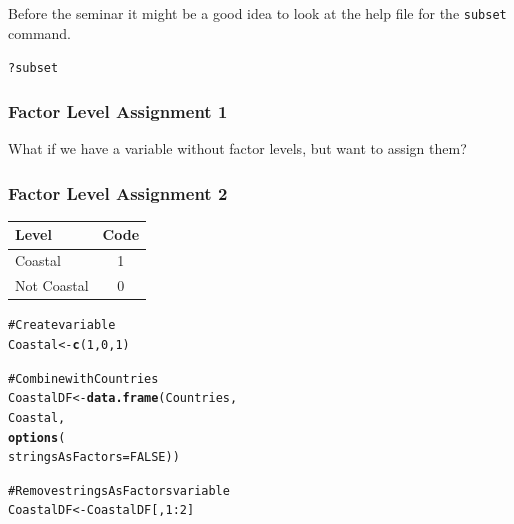 \documentclass{beamer}\usepackage{graphicx, color}
\makeatletter
\newcommand{\hlfunctioncall}[1]{\textcolor[rgb]{0.501960784313725,0,0.329411764705882}{\textbf{#1}}}%
\newcommand{\hlcomment}[1]{\textcolor[rgb]{0.180392156862745,0.6,0.341176470588235}{#1}}%
\newenvironment{kframe}{%
 \def\at@end@of@kframe{}%
 \ifinner\ifhmode%
  \def\at@end@of@kframe{\end{minipage}}%
  \begin{minipage}{\columnwidth}%
 \fi\fi%
 \def\FrameCommand##1{\hskip\@totalleftmargin \hskip-\fboxsep
 \colorbox{shadecolor}{##1}\hskip-\fboxsep
     \hskip-\linewidth \hskip-\@totalleftmargin \hskip\columnwidth}%
 \MakeFramed {\advance\hsize-\width
   \@totalleftmargin\z@ \linewidth\hsize
   \@setminipage}}%
 {\par\unskip\endMakeFramed%
 \at@end@of@kframe}
\newenvironment{knitrout}{}{} %
\makeatother
\begin{document}
\begin{frame}[fragile]
  Before the seminar it might be a good idea to look at the help file for the \texttt{subset} command.
\begin{knitrout}
\color{fgcolor}\begin{kframe}
\begin{alltt}
?subset
\end{alltt}
\end{kframe}
\end{knitrout}

\end{frame}

\begin{frame}[fragile]
  \frametitle{Factor Level Assignment 1}
  What if we have a variable without factor levels, but want to assign them?
\end{frame}

\begin{frame}[fragile]
  \frametitle{Factor Level Assignment 2}
  \begin{small}
  \begin{table}
    \begin{tabular}{l c}
    \hline
    Level & Code \\
    \hline \hline
    Coastal & 1 \\
    Not Coastal & 0
    \end{tabular}
  \end{table}
  \end{small}
\end{frame}

\begin{frame}[fragile]
\begin{knitrout}
\color{fgcolor}\begin{kframe}
\begin{alltt}
\hlcomment{# Create variable}
Coastal <- \hlfunctioncall{c}(1, 0, 1)

\hlcomment{# Combine with Countries}
CoastalDF <- \hlfunctioncall{data.frame}(Countries,
                        Coastal,
                        \hlfunctioncall{options}(
                          stringsAsFactors = FALSE))

\hlcomment{# Remove stringsAsFactors variable}
CoastalDF <- CoastalDF[, 1:2]
\end{alltt}
\end{kframe}
\end{knitrout}

\end{frame}
\end{document}
